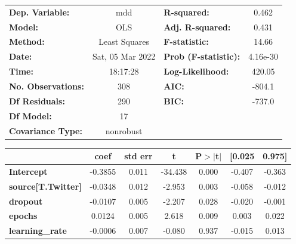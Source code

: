 \begin{center}
\begin{tabular}{lclc}
\toprule
\textbf{Dep. Variable:}                   &       mdd        & \textbf{  R-squared:         } &     0.462   \\
\textbf{Model:}                           &       OLS        & \textbf{  Adj. R-squared:    } &     0.431   \\
\textbf{Method:}                          &  Least Squares   & \textbf{  F-statistic:       } &     14.66   \\
\textbf{Date:}                            & Sat, 05 Mar 2022 & \textbf{  Prob (F-statistic):} &  4.16e-30   \\
\textbf{Time:}                            &     18:17:28     & \textbf{  Log-Likelihood:    } &    420.05   \\
\textbf{No. Observations:}                &         308      & \textbf{  AIC:               } &    -804.1   \\
\textbf{Df Residuals:}                    &         290      & \textbf{  BIC:               } &    -737.0   \\
\textbf{Df Model:}                        &          17      & \textbf{                     } &             \\
\textbf{Covariance Type:}                 &    nonrobust     & \textbf{                     } &             \\
\bottomrule
\end{tabular}
\begin{tabular}{lcccccc}
                                          & \textbf{coef} & \textbf{std err} & \textbf{t} & \textbf{P$> |$t$|$} & \textbf{[0.025} & \textbf{0.975]}  \\
\midrule
\textbf{Intercept}                        &      -0.3855  &        0.011     &   -34.438  &         0.000        &       -0.407    &       -0.363     \\
\textbf{source[T.Twitter]}                &      -0.0348  &        0.012     &    -2.953  &         0.003        &       -0.058    &       -0.012     \\
\textbf{dropout}                          &      -0.0107  &        0.005     &    -2.207  &         0.028        &       -0.020    &       -0.001     \\
\textbf{epochs}                           &       0.0124  &        0.005     &     2.618  &         0.009        &        0.003    &        0.022     \\
\textbf{learning\_rate}                   &      -0.0006  &        0.007     &    -0.080  &         0.937        &       -0.015    &        0.013     \\

\end{tabular}
\end{center}
